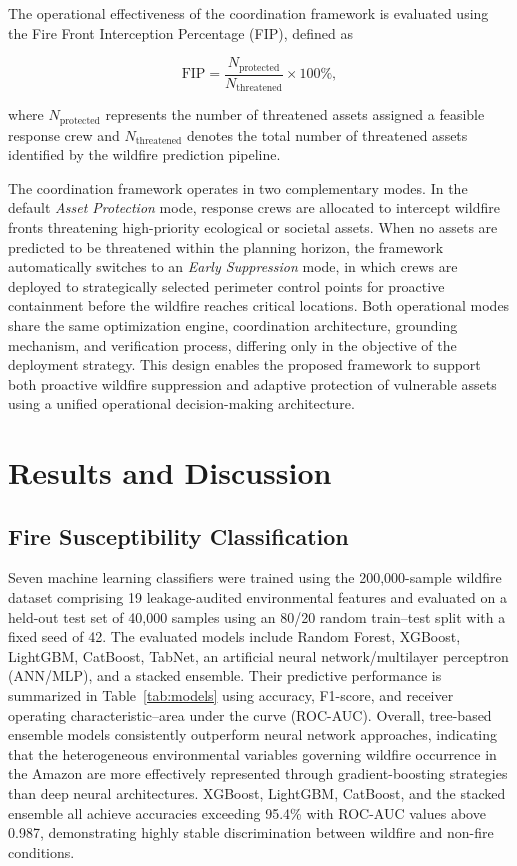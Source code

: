 \documentclass{ieeeaccess}
\begin{document}
The operational effectiveness of the coordination framework is evaluated using the Fire Front Interception Percentage (FIP), defined as

\begin{equation}
\text{FIP}
=
\frac{N_{\text{protected}}}
{N_{\text{threatened}}}
\times100\%,
\label{eq:fip}
\end{equation}

where $N_{\text{protected}}$ represents the number of threatened assets assigned a feasible response crew and $N_{\text{threatened}}$ denotes the total number of threatened assets identified by the wildfire prediction pipeline.

The coordination framework operates in two complementary modes. In the default \emph{Asset Protection} mode, response crews are allocated to intercept wildfire fronts threatening high-priority ecological or societal assets. When no assets are predicted to be threatened within the planning horizon, the framework automatically switches to an \emph{Early Suppression} mode, in which crews are deployed to strategically selected perimeter control points for proactive containment before the wildfire reaches critical locations. Both operational modes share the same optimization engine, coordination architecture, grounding mechanism, and verification process, differing only in the objective of the deployment strategy. This design enables the proposed framework to support both proactive wildfire suppression and adaptive protection of vulnerable assets using a unified operational decision-making architecture.


\section{Results and Discussion}
\subsection{Fire Susceptibility Classification}
\label{sec:substrate-results}

Seven machine learning classifiers were trained using the 200,000-sample wildfire dataset comprising 19 leakage-audited environmental features and evaluated on a held-out test set of 40,000 samples using an 80/20 random train--test split with a fixed seed of 42. The evaluated models include Random Forest, XGBoost, LightGBM, CatBoost, TabNet, an artificial neural network/multilayer perceptron (ANN/MLP), and a stacked ensemble. Their predictive performance is summarized in Table~\ref{tab:models} using accuracy, F1-score, and receiver operating characteristic--area under the curve (ROC-AUC). Overall, tree-based ensemble models consistently outperform neural network approaches, indicating that the heterogeneous environmental variables governing wildfire occurrence in the Amazon are more effectively represented through gradient-boosting strategies than deep neural architectures. XGBoost, LightGBM, CatBoost, and the stacked ensemble all achieve accuracies exceeding 95.4\% with ROC-AUC values above 0.987, demonstrating highly stable discrimination between wildfire and non-fire conditions.
\end{document}
